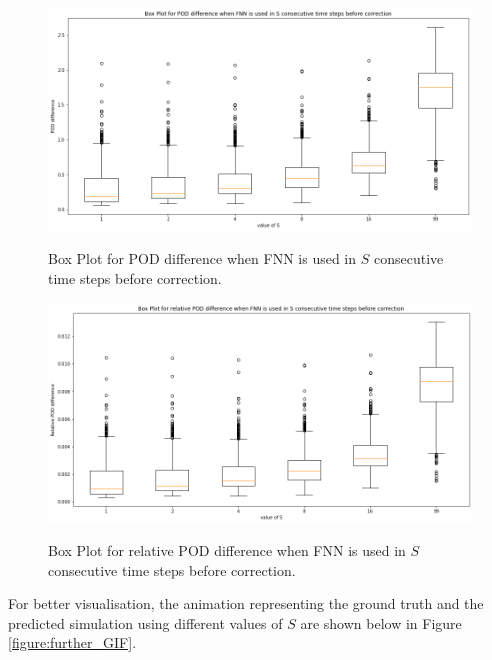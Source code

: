 \begin{figure}[H]
    \caption{Box Plot for POD difference when FNN is used in $S$ consecutive time steps before correction.}
    \includegraphics[scale=0.4]{figures/mantle_convection_images/further_testings/POD_boxplot.png}
    \label{figure:further_POD_Box}
\end{figure}

\begin{figure}[H]
    \caption{Box Plot for relative POD difference when FNN is used in $S$ consecutive time steps before correction.}
    \includegraphics[scale=0.4]{figures/mantle_convection_images/further_testings/Relative_POD_boxplot.png}
    \label{figure:further_relative_POD_Box}
\end{figure}

For better visualisation, the animation representing the ground truth and the predicted simulation using different values of $S$ are shown below in Figure \ref{figure:further_GIF}.

